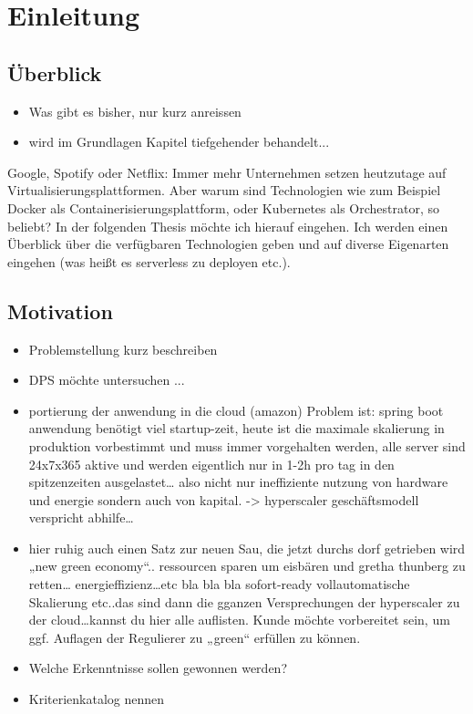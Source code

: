 \chapter{Einleitung}

\section{\"Uberblick}
\begin{itemize}
  \item Was gibt es bisher, nur kurz anreissen
  \item wird im Grundlagen Kapitel tiefgehender behandelt...
\end{itemize}

Google, Spotify oder Netflix: Immer mehr Unternehmen setzen heutzutage auf Virtualisierungsplattformen. Aber warum sind Technologien wie zum Beispiel Docker als Containerisierungsplattform, oder Kubernetes als Orchestrator, so beliebt? In der folgenden Thesis möchte ich hierauf eingehen. Ich werden einen Überblick über die verfügbaren Technologien geben und auf diverse Eigenarten eingehen (was heißt es serverless zu deployen etc.). 




\section{Motivation}
\begin{itemize}
  \item Problemstellung kurz beschreiben
  \item DPS m\"ochte untersuchen ...
  \item portierung der anwendung in die cloud (amazon)  Problem ist: spring boot anwendung benötigt viel startup-zeit, heute ist die maximale skalierung in produktion vorbestimmt und muss immer vorgehalten werden, alle server sind 24x7x365 aktive und werden eigentlich nur in 1-2h pro tag in den spitzenzeiten ausgelastet… also nicht nur ineffiziente nutzung von hardware und energie sondern auch von kapital. -> hyperscaler geschäftsmodell verspricht abhilfe…
  \item hier ruhig auch einen Satz zur neuen Sau, die jetzt durchs dorf getrieben wird „new green economy“.. ressourcen sparen um eisbären und gretha thunberg zu retten… energieffizienz…etc bla bla bla sofort-ready vollautomatische Skalierung etc..das sind dann die gganzen Versprechungen der hyperscaler zu der cloud…kannst du hier alle auflisten.  Kunde möchte vorbereitet sein, um ggf. Auflagen der Regulierer zu „green“ erfüllen zu können.
  \item Welche Erkenntnisse sollen gewonnen werden?
  \item Kriterienkatalog nennen
\end{itemize}

